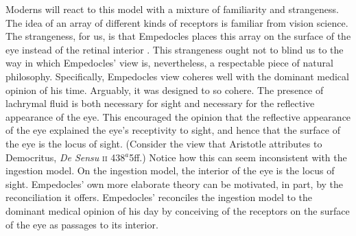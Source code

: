 Moderns will react to this model with a mixture of familiarity and strangeness. The idea of an array of different kinds of receptors is familiar from vision science. The strangeness, for us, is that Empedocles places this array on the surface of the eye instead of the retinal interior \citep[for a comparison of Empedocles' theory with modern theories of vision see][]{Siegel:1959fk}. This strangeness ought not to blind us to the way in which Empedocles' view is, nevertheless, a respectable piece of natural philosophy. Specifically, Empedocles view coheres well with the dominant medical opinion of his time. Arguably, it was designed to so cohere. The presence of lachrymal fluid is both necessary for sight and necessary for the reflective appearance of the eye. This encouraged the opinion that the reflective appearance of the eye explained the eye's receptivity to sight, and hence that the surface of the eye is the locus of sight. (Consider the view that Aristotle attributes to Democritus, \emph{De Sensu} \textsc{ii} 438\( ^{a} \)5ff.) Notice how this can seem inconsistent with the ingestion model. On the ingestion model, the interior of the eye is the locus of sight. Empedocles' own more elaborate theory can be motivated, in part, by the reconciliation it offers. Empedocles' reconciles the ingestion model to the dominant medical opinion of his day by conceiving of the receptors on the surface of the eye as passages to its interior.


